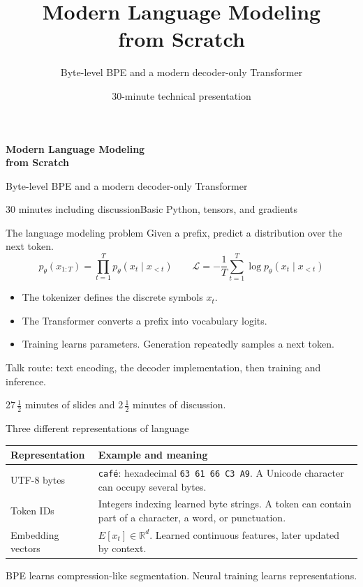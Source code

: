 \documentclass[11pt,aspectratio=169]{beamer}
\title{Modern Language Modeling\\from Scratch}
\subtitle{Byte-level BPE and a modern decoder-only Transformer}
\date{30-minute technical presentation}
\begin{document}
\begin{frame}
\par\vspace{8mm}
{\huge\bfseries Modern Language Modeling\\[2mm]from Scratch\par}
\par\vspace{6mm}
{\large Byte-level BPE and a modern decoder-only Transformer\par}
\par\vspace{5mm}
\textcolor{muted}{30 minutes including discussion\quad\textbullet\quad Basic Python, tensors, and gradients}
\end{frame}

\begin{frame}{The language modeling problem}
Given a prefix, predict a distribution over the next token.
\[
p_\theta(x_{1:T})=\prod_{t=1}^{T}p_\theta(x_t\mid x_{<t})
\qquad
\mathcal L=-\frac1T\sum_{t=1}^{T}\log p_\theta(x_t\mid x_{<t})
\]
\begin{itemize}
\item The tokenizer defines the discrete symbols $x_t$.
\item The Transformer converts a prefix into vocabulary logits.
\item Training learns parameters. Generation repeatedly samples a next token.
\end{itemize}
\par\vspace{3mm}
\alert{Talk route:} text encoding, the decoder implementation, then training and inference.\par
27\,$\frac12$ minutes of slides and 2\,$\frac12$ minutes of discussion.
\end{frame}

\begin{frame}{Three different representations of language}
\begin{tabular}{@{}>{\raggedright\arraybackslash}p{}>{\raggedright\arraybackslash}p{}@{}}
\toprule
Representation & Example and meaning\\\midrule
UTF-8 bytes & \texttt{caf\'e}: hexadecimal \texttt{63 61 66 C3 A9}. A Unicode character can occupy several bytes.\\[3mm]
Token IDs & Integers indexing learned byte strings. A token can contain part of a character, a word, or punctuation.\\[3mm]
Embedding vectors & $E[x_t]\in\mathbb R^d$. Learned continuous features, later updated by context.\\
\bottomrule
\end{tabular}\par
\par\vspace{4mm}
\alert{BPE learns compression-like segmentation. Neural training learns representations.}
\end{frame}
\end{document}
